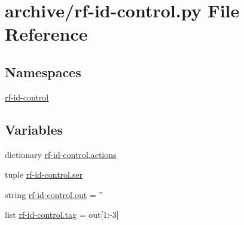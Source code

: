 \hypertarget{rf-id-control_8py}{\section{archive/rf-\/id-\/control.py File Reference}
\label{rf-id-control_8py}
}
\subsection*{Namespaces}
\begin{DoxyCompactItemize}
\item 
\hyperlink{namespacerf-id-control}{rf-\/id-\/control}
\end{DoxyCompactItemize}
\subsection*{Variables}
\begin{DoxyCompactItemize}
\item 
dictionary \hyperlink{namespacerf-id-control_a44ce566fe9439db91445bbacc055dfba}{rf-\/id-\/control.\-actions}
\item 
tuple \hyperlink{namespacerf-id-control_ad75e60402f9b3cb86ddbce12f4c99256}{rf-\/id-\/control.\-ser}
\item 
string \hyperlink{namespacerf-id-control_a340302d5b6d011871e45b3b847dab3a6}{rf-\/id-\/control.\-out} = ''
\item 
list \hyperlink{namespacerf-id-control_a10a094d39156477476efd89f406dae97}{rf-\/id-\/control.\-tag} = out\mbox{[}1\-:-\/3\mbox{]}
\end{DoxyCompactItemize}

